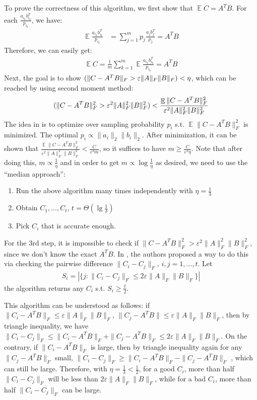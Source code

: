 \documentclass[11pt]{article}
\DeclareMathOperator*{\E}{\mathbb{E}}
\let\Pr\relax
\DeclareMathOperator*{\Pr}{\mathbb{P}}
\begin{document}
To prove the correctness of this algorithm, we first show that $\E C = A^T B$. For each $\frac{a_{i_k}b_{i_k}^T}{p_{i_k}}$, we have:
\begin{align*}
\E \frac{a_{i_k}b_{i_k}^T}{p_{i_k}} &= \sum_{j=1}^m p_j \frac{a_jb_j^T}{p_j} = A^TB
\end{align*}
Therefore, we can easily get:
\begin{align*}
\E C = \frac{1}{m} \sum_{k=1}^m \E \frac{a_{i_k}b_{i_k}^T}{p_{i_k}} = A^T B
\end{align*}
Next, the goal is to show $\Pr(\|C-A^TB\|_F>\varepsilon \|A\|_F\|B\|_F)<\eta$, which can be reached by using second moment method:
\begin{align*}
\Pr(\|C-A^TB\|_F^2>\varepsilon^2 \|A\|_F^2\|B\|_F^2)< \frac{\E \|C-A^TB\|_F^2}{\varepsilon^2 \|A\|_F^2\|B\|_F^2}
\end{align*}
The idea in \cite{Drineas06} is to optimize over sampling probability $p_i$ s.t. $\E \|C-A^TB\|_F^2$ is minimized. The optimal $p_i\propto \|a_i\|_2\|b_i\|_2$. After minimization, it can be shown that $\frac{\E \|C-A^TB\|_F^2}{\varepsilon^2 \|A\|_F^2\|B\|_F^2} < \frac{C}{\varepsilon^2 m}$, so it suffices to have $m\geq \frac{C}{\varepsilon^2 \eta}$.
Note that after doing this, $m\propto \frac{1}{\eta}$ and in order to get $m\propto \log \frac{1}{\eta}$ as desired, we need to use the ``median approach'':
\begin{enumerate}
\item
Run the above algorithm many times independently with $\eta=\frac{1}{3}$
\item
Obtain $C_1,\ldots,C_t$, $t=\Theta(\lg\frac{1}{\delta})$
\item
Pick $C_i$ that is accurate enough.
\end{enumerate}
For the 3rd step, it is impossible to check if $\|C-A^TB\|_F^2>\varepsilon^2 \|A\|_F^2\|B\|_F^2$, since we don't know the exact $A^TB$. In \cite{Clarkson09}, the authors proposed a way to do this via checking the pairwise difference $\|C_i-C_j\|_F,~i,j=1,\ldots,t$. Let
\begin{align*}
S_i = |\{j:\|C_i-C_j\|_F\leq 2 \varepsilon \|A\|_F\|B\|_F\}|
\end{align*}
the algorithm returns any $C_i$ s.t. $S_i\geq \frac{t}{2}$.

This algorithm can be understood as follows: if $\|C_i-A^TB\|_F\leq \varepsilon \|A\|_F\|B\|_F$, $\|C_j-A^TB\|\leq \varepsilon \|A\|_F\|B\|_F$, then by triangle inequality, we have $\|C_i-C_j\|_F\leq \|C_i-A^TB\|_F+\|C_j-A^TB\|_F \leq 2\varepsilon \|A\|_F\|B\|_F$. On the contrary, if $\|C_i-A^TB\|_F$ is large, then by triangle inequality again for any $\|C_j-A^TB\|_F$ small, $\|C_i-C_j\|_F\geq \|C_i-A^TB\|_F-\|C_j-A^TB\|_F$ , which can still be large. Therefore, with $\eta=\frac{1}{3}<\frac{1}{2}$, for a good $C_i$, more than half $\|C_i-C_j\|_F$ will be less than $2\varepsilon\|A\|_F\|B\|_F$, while for a bad $C_i$, more than half $\|C_i-C_j\|_F$ can be large.
\end{document}
